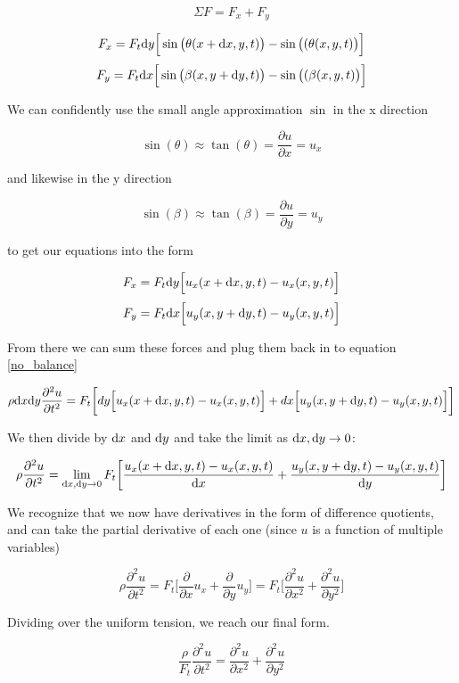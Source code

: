 $$\Sigma F = F_x + F_y$$

$$F_x = F_t\mathrm d y\Big[\sin\big( \theta (x+\mathrm d x,y,t) \big) - \sin \big((\theta (x,y,t)\big)\Big]$$
$$F_y = F_t\mathrm d x\Big[\sin\big( \beta (x,y+\mathrm d y,t) \big) - \sin \big((\beta (x,y,t)\big)\Big]$$

\noindent We can confidently use the small angle approximation $\sin$ in the x direction

$$ \sin(\theta) \approx \tan(\theta) = \frac{\partial u}{\partial x} = u_x$$

\noindent and likewise in the y direction 

$$ \sin(\beta) \approx \tan(\beta) = \frac{\partial u}{\partial y} = u_y$$

\noindent to get our equations into the form

$$F_x = F_t\mathrm d y\Big[u_x(x+\mathrm d x,y,t) - u_x(x,y,t)\Big]$$
$$F_y = F_t\mathrm d x\Big[u_y(x,y+\mathrm d y,t) - u_y(x,y,t)\Big]$$

\noindent From there we can sum these forces and plug them back in to equation \ref{no_balance}

$$\rho \mathrm d x\mathrm d y \frac{\partial^2u}{\partial t^2} = F_t\bigg[dy\Big[u_x(x+\mathrm d x,y,t) - u_x(x,y,t)\Big]+dx\Big[u_y(x,y+\mathrm d y,t) - u_y(x,y,t)\Big] \bigg]$$

\noindent We then divide by $\mathrm d x$ and $\mathrm d y$ and take the limit as $\mathrm d x,\mathrm d y \to 0$:

$$\rho\frac{\partial^2u}{\partial t^2} = \lim_{\mathrm d x,\mathrm d y\to 0} F_t \bigg[ \frac{u_x(x+\mathrm d x,y,t) - u_x(x,y,t)}{\mathrm d x} + \frac{u_y(x,y+\mathrm d y,t) - u_y(x,y,t)}{\mathrm d y} \bigg]$$

\noindent We recognize that we now have derivatives in the form of difference quotients, and can take the partial derivative of each one (since $u$ is a function of multiple variables)

\begin{equation}
\rho \frac{\partial^2u}{\partial t^2} = F_t\bigg[\frac{\partial}{\partial x}u_x + \frac{\partial}{\partial y}u_y \bigg] = F_t\bigg[\frac{\partial^2 u}{\partial x^2} + \frac{\partial^2 u}{\partial y^2}\bigg]
\end{equation}

\noindent Dividing over the uniform  tension, we reach our final form.

\begin{equation}
\frac{\rho}{F_t}\frac{\partial^2u}{\partial t^2} = \frac{\partial^2 u}{\partial x^2} + \frac{\partial^2 u}{\partial y^2}
\end{equation}

